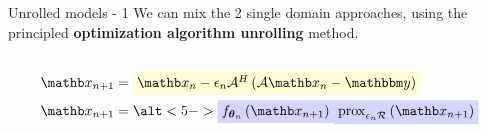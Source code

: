 \begin{frame}{Unrolled models - 1}
    We can mix the 2 single domain approaches, using the principled \textbf{optimization algorithm unrolling} method.

    \begin{columns}[totalwidth=\textwidth]
        \begin{column}[]{0.3\textwidth}

            \begin{equation*}
                \begin{split}
                    \xb_{n+1} &= \highlight{yellow}{$\xb_n - \epsilon_n \mathcal{A}^H\left(\mathcal{A} \xb_n - \ybb\right)$}\\
                    \xb_{n+1} &= \alt<5->{\highlight{blue}{$f_{\thetab_n}\left(\xb_{n+1}\right)$}}{\highlight{blue}{$\operatorname{prox}_{\epsilon_n \mathcal{R}}\left(\xb_{n+1}\right)$}}
                \end{split}
            \end{equation*}


\end{column}
\end{columns}
\end{frame}
